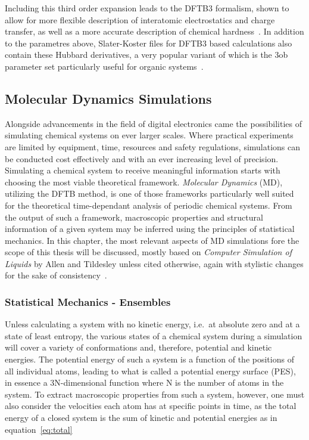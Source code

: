 \documentclass[11pt]{article}
\begin{document}
\bigskip 

\noindent Including this third order expansion leads to the DFTB3 formalism, shown to allow for more flexible description of interatomic electrostatics and charge transfer, as well as a more accurate description of chemical hardness~\cite{yangsource}. In addition to the parametres above, Slater-Koster files for DFTB3 based calculations also contain these Hubbard derivatives, a very popular variant of which is the 3ob parameter set particularly useful for organic systems~\cite{Gaus2012}.

\subsection{Molecular Dynamics Simulations}
Alongside advancements in the field of digital electronics came the possibilities of simulating chemical 
systems on ever larger scales. Where practical experiments are limited by equipment, time, resources and safety regulations, 
simulations can be conducted cost effectively and with an ever increasing level of precision.
Simulating a chemical system to receive meaningful information starts with choosing the most viable
theoretical framework. \textit{Molecular Dynamics} (MD), utilizing the DFTB method, is one of those frameworks particularly well suited for  the theoretical time-dependant analysis of periodic chemical systems. From the output of such a framework, macroscopic properties and structural information of a given system may be inferred using the principles of statistical mechanics.
In this chapter, the most relevant aspects of MD simulations fore the scope of this thesis will be discussed, mostly based on \textit{Computer Simulation of Liquids} by Allen and Tildesley unless cited otherwise, again with stylistic changes for the sake of consistency~\cite{Allen2017}.

\subsubsection{Statistical Mechanics - Ensembles}
Unless calculating a system with no kinetic energy, i.e.~at absolute zero and at a state of least entropy, the various states of a chemical system during a simulation will cover a variety of conformations and, therefore, potential and kinetic energies. The potential energy of such a system is a function of the positions of all individual atoms, leading to what is called a potential energy surface (PES), in essence a 3N-dimensional function where N is the number of atoms in the system. To extract macroscopic properties from such a system, however, one must also consider the velocities each atom has at specific points in time, as the total energy of a closed system is the sum of kinetic and potential energies as in equation~\ref{eq:total}
\end{document}
